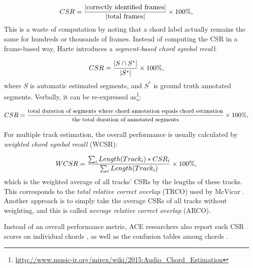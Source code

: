 \begin{equation}
CSR={|\text{correctly identified frames}| \over |\text{total frames}|}\times 100\%,
\end{equation}
This is a waste of computation by noting that a chord label actually remains the same for hundreds or thousands of frames. Instead of computing the CSR in a frame-based way, Harte \cite{harte2010towards} introduces a {\it segment-based chord symbol recall}:

\begin{equation}
CSR = {|S\cap S^*|\over|S^*|} \times 100\%,
\label{eq:2-csr}
\end{equation}
where $S$ is automatic estimated segments, and $S^*$ is ground truth annotated segments. Verbally, it can be re-expressed as\footnote{\url{http://www.music-ir.org/mirex/wiki/2015:Audio\_Chord\_Estimation}}:

\begin{equation}\footnotesize
CSR = {\text{total duration of segments where chord annotation equals chord estimation}\over\text{the total duration of annotated segments}} \times 100\%,
\label{eq:2-csrv}
\end{equation}

For multiple track estimation, the overall performance is usually calculated by {\it weighted chord symbol recall} (WCSR):

\begin{equation}
WCSR = {\sum_i{Length(Track_i)*CSR_i} \over \sum_i{Length(Track_i)}}\times 100\%,
\label{eq:2-wcsr}
\end{equation}
which is the weighted average of all tracks' CSRs by the lengths of these tracks. This corresponds to the {\it total relative correct overlap} (TRCO) used by McVicar \cite{mcvicar2013machine}. Another approach is to simply take the average CSRs of all tracks without weighting, and this is called {\it average relative correct overlap} (ARCO).

Instead of an overall performance metric, ACE researchers also report such CSR scores on individual chords \cite{mauch2010automatic,deng2016chord}, as well as the confusion tables among chords \cite{mauch2010automatic,oudre2010template,papadopoulos2010joint,khadkevich2011music,deng2016hybrid}.

